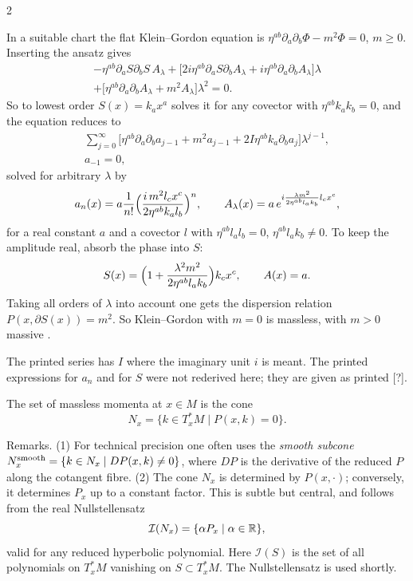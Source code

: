 \begin{paracol}{2}
\begin{example}\label{ex:c29-KGflat}
In a suitable chart the flat Klein--Gordon equation is $\eta^{ab}\partial_a\partial_b\Phi-m^2\Phi=0$, $m\ge0$. Inserting the ansatz gives
\begin{multline*}
  -\eta^{ab}\partial_aS\partial_bS\,A_\lambda+\bigl[2i\eta^{ab}\partial_aS\partial_bA_\lambda+i\eta^{ab}\partial_a\partial_bA_\lambda\bigr]\lambda\\+\bigl[\eta^{ab}\partial_a\partial_bA_\lambda+m^2A_\lambda\bigr]\lambda^2=0.
\end{multline*}
So to lowest order $S(x)=k_ax^a$ solves it for any covector with $\eta^{ab}k_ak_b=0$, and the equation reduces to
\begin{gather*}
  \sum_{j=0}^\infty\bigl[\eta^{ab}\partial_a\partial_ba_{j-1}+m^2a_{j-1}+2I\eta^{ab}k_a\partial_ba_j\bigr]\lambda^{j-1},\\ a_{-1}=0,
\end{gather*}
solved for arbitrary $\lambda$ by
\[
  a_n(x)=a\frac1{n!}\Bigl(\frac{i\,m^2l_cx^c}{2\eta^{ab}k_al_b}\Bigr)^n,\qquad A_\lambda(x)=a\,e^{i\frac{\lambda m^2}{2\eta^{ab}l_ak_b}l_cx^c},
\]
for a real constant $a$ and a covector $l$ with $\eta^{ab}l_al_b=0$, $\eta^{ab}l_ak_b\ne0$. To keep the amplitude real, absorb the phase into $S$:
\[
  S(x)=\Bigl(1+\frac{\lambda^2m^2}{2\eta^{ab}l_ak_b}\Bigr)k_cx^c,\qquad A(x)=a.
\]
Taking all orders of $\lambda$ into account one gets the dispersion relation $P(x,\partial S(x))=m^2$. So Klein--Gordon with $m=0$ is massless, with $m>0$ massive .
\end{example}
\begin{coursenote}
The printed series has $I$ where the imaginary unit $i$ is meant. The printed expressions for $a_n$ and for $S$ were not rederived here; they are given as printed [?].
\end{coursenote}

\begin{definition}\label{def:c29-null}
The set of massless momenta at $x\in M$ is the cone
\[
  N_x=\{k\in T^*_xM\mid P(x,k)=0\}.
\]
\end{definition}

Remarks. (1) For technical precision one often uses the \emph{smooth subcone} $N_x^{\rm smooth}=\{k\in N_x\mid DP(x,k)\ne0\}$, where $DP$ is the derivative of the reduced $P$ along the cotangent fibre. (2) The cone $N_x$ is determined by $P(x,\cdot)$; conversely, it determines $P_x$ up to a constant factor. This is subtle but central, and follows from the real Nullstellensatz
\[
  \mathcal I(N_x)=\{\alpha P_x\mid\alpha\in\mathbb{R}\},
\]
valid for any reduced hyperbolic polynomial. Here $\mathcal I(S)$ is the set of all polynomials on $T^*_xM$ vanishing on $S\subset T^*_xM$. The Nullstellensatz is used shortly.


\end{paracol}
